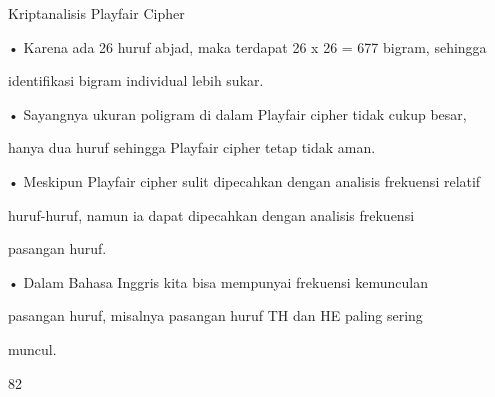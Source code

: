 \documentclass{article}
\begin{document}

Kriptanalisis Playfair Cipher

• Karena ada 26 huruf abjad, maka terdapat 26 x 26 = 677 bigram, sehingga 

identifikasi bigram individual lebih sukar.

• Sayangnya ukuran poligram di dalam Playfair cipher tidak cukup besar, 

hanya dua huruf sehingga Playfair cipher  tetap tidak aman. 

• Meskipun Playfair cipher sulit dipecahkan dengan analisis frekuensi relatif 

huruf-huruf, namun ia dapat dipecahkan dengan analisis frekuensi 

pasangan huruf. 

• Dalam Bahasa Inggris kita bisa mempunyai  frekuensi kemunculan 

pasangan huruf, misalnya pasangan huruf TH dan HE paling sering 

muncul. 

82
\end{document}
